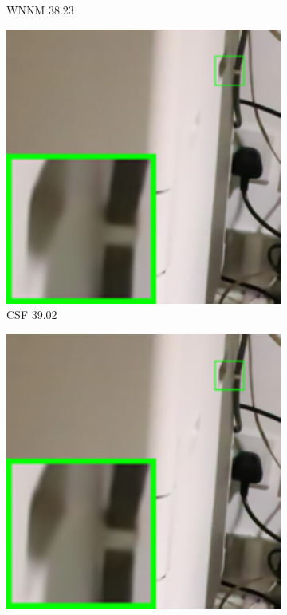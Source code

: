 \begin{figure}
\begin{subfigure}[t]{0.19\textwidth}
\caption{WNNM 38.23}
    \end{subfigure}
    \hfill
    \begin{subfigure}[t]{0.19\textwidth}
        \centering
        \includegraphics[width=1\textwidth]{images/guided/resize_br_CSF_Canon_80D_ISO12800_IMG_2321_part2.png}
\caption{CSF 39.02}
    \end{subfigure}
    \hfill
    \begin{subfigure}[t]{0.19\textwidth}
        \centering
        \includegraphics[width=1\textwidth]{images/guided/resize_br_TRD_Canon_80D_ISO12800_IMG_2321_part2.png}

\end{subfigure}
\end{figure}
